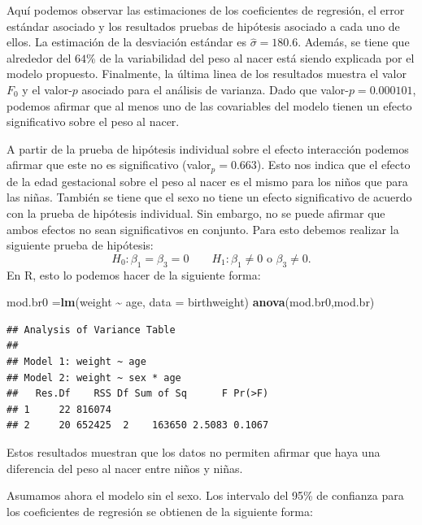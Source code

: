 \documentclass[
]{article}
\newenvironment{Shaded}{\begin{snugshade}}{\end{snugshade}}
\newcommand{\AttributeTok}[1]{\textcolor[rgb]{0.13,0.29,0.53}{#1}}
\newcommand{\FunctionTok}[1]{\textcolor[rgb]{0.13,0.29,0.53}{\textbf{#1}}}
\newcommand{\NormalTok}[1]{#1}
\newcommand{\OtherTok}[1]{\textcolor[rgb]{0.56,0.35,0.01}{#1}}
\newcommand{\SpecialCharTok}[1]{\textcolor[rgb]{0.81,0.36,0.00}{\textbf{#1}}}
\begin{document}
Aquí podemos observar las estimaciones de los coeficientes de regresión, el error estándar asociado y los resultados pruebas de hipótesis asociado a cada uno de ellos. La estimación de la desviación estándar es \(\widehat{\sigma}=180.6\). Además, se tiene que alrededor del \(64\)\% de la variabilidad del peso al nacer está siendo explicada por el modelo propuesto. Finalmente, la última linea de los resultados muestra el valor \(F_0\) y el valor-\(p\) asociado para el análisis de varianza. Dado que valor-\(p=0.000101\), podemos afirmar que al menos uno de las covariables del modelo tienen un efecto significativo sobre el peso al nacer.

A partir de la prueba de hipótesis individual sobre el efecto interacción podemos afirmar que este no es significativo (valor\(_p=0.663\)). Esto nos indica que el efecto de la edad gestacional sobre el peso al nacer es el mismo para los niños que para las niñas. También se tiene que el sexo no tiene un efecto significativo de acuerdo con la prueba de hipótesis individual. Sin embargo, no se puede afirmar que ambos efectos no sean significativos en conjunto. Para esto debemos realizar la siguiente prueba de hipótesis:
\[
H_0: \beta_1 = \beta_3=0 \qquad H_1: \beta_1 \neq 0 \mbox{ o } \beta_3 \neq 0.
\]
En R, esto lo podemos hacer de la siguiente forma:

\begin{Shaded}
\begin{Highlighting}[]
\NormalTok{mod.br0 }\OtherTok{=}\FunctionTok{lm}\NormalTok{(weight }\SpecialCharTok{\textasciitilde{}}\NormalTok{ age, }\AttributeTok{data =}\NormalTok{ birthweight)}
\FunctionTok{anova}\NormalTok{(mod.br0,mod.br)}
\end{Highlighting}
\end{Shaded}

\begin{verbatim}
## Analysis of Variance Table
## 
## Model 1: weight ~ age
## Model 2: weight ~ sex * age
##   Res.Df    RSS Df Sum of Sq      F Pr(>F)
## 1     22 816074                           
## 2     20 652425  2    163650 2.5083 0.1067
\end{verbatim}

Estos resultados muestran que los datos no permiten afirmar que haya una diferencia del peso al nacer entre niños y niñas.

Asumamos ahora el modelo sin el sexo. Los intervalo del 95\% de confianza para los coeficientes de regresión se obtienen de la siguiente forma:
\end{document}
